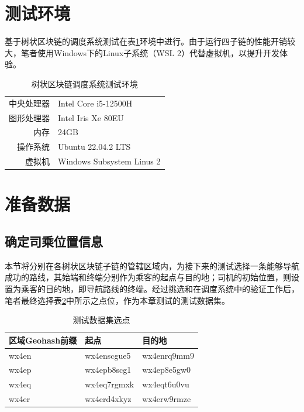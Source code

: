\section{测试环境}

基于树状区块链的调度系统测试在表\ref{树状区块链调度系统测试环境}环境中进行。由于运行四子链的性能开销较大，笔者使用Windows下的Linux子系统（WSL 2）代替虚拟机，以提升开发体验。

\begin{table}[htbp]
    \linespread{1.5}
    \centering
    \caption{树状区块链调度系统测试环境}\label{树状区块链调度系统测试环境}
    \begin{tabular}{r|l} \toprule
        中央处理器 & Intel Core i5-12500H      \\
        图形处理器 & Intel Iris Xe 80EU        \\
        内存    & 24GB                      \\
        操作系统  & Ubuntu 22.04.2 LTS        \\
        虚拟机   & Windows Subsystem Linus 2 \\
        \bottomrule
    \end{tabular}
\end{table}

\section{准备数据}

\subsection{确定司乘位置信息}

本节将分别在各树状区块链子链的管辖区域内，为接下来的测试选择一条能够导航成功的路线，其始端和终端分别作为乘客的起点与目的地；司机的初始位置，则设置为乘客的目的地，即导航路线的终端。经过挑选和在调度系统中的验证工作后，笔者最终选择表\ref{测试数据集选点}中所示之点位，作为本章测试的测试数据集。

\begin{table}[htbp]
    \linespread{1.5}
    \centering
    \caption{测试数据集选点}\label{测试数据集选点}
    \begin{tabular}{l|l|l} \toprule
        区域Geohash前缀 & 起点          & 目的地         \\\hline
        wx4en       & wx4enscgue5 & wx4enrq9mm9 \\
        wx4ep       & wx4epb8scg1 & wx4ep8e5gw0 \\
        wx4eq       & wx4eq7rgmxk & wx4eqt6u0vu \\
        wx4er       & wx4erd4xkyz & wx4erw9rmze \\
        \bottomrule
    \end{tabular}
\end{table}

